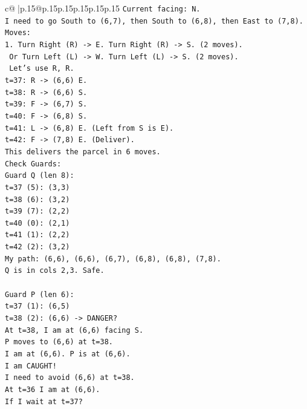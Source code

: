 \documentclass{article}
\begin{document}
{\begin{supertabular}{c@{$\;$}|p{.15\linewidth}@{}p{.15\linewidth}p{.15\linewidth}p{.15\linewidth}p{.15\linewidth}p{.15\linewidth}}
{{{\texttt{Current facing: N.} \\
\texttt{I need to go South to (6,7), then South to (6,8), then East to (7,8).} \\
\texttt{Moves:} \\
\texttt{1. Turn Right (R) {-}> E. Turn Right (R) {-}> S. (2 moves).} \\
\texttt{   Or Turn Left (L) {-}> W. Turn Left (L) {-}> S. (2 moves).} \\
\texttt{   Let's use R, R.} \\
\texttt{t=37: R {-}> (6,6) E.} \\
\texttt{t=38: R {-}> (6,6) S.} \\
\texttt{t=39: F {-}> (6,7) S.} \\
\texttt{t=40: F {-}> (6,8) S.} \\
\texttt{t=41: L {-}> (6,8) E. (Left from S is E).} \\
\texttt{t=42: F {-}> (7,8) E. (Deliver).} \\
\texttt{This delivers the parcel in 6 moves.} \\
\texttt{Check Guards:} \\
\texttt{Guard Q (len 8):} \\
\texttt{t=37 (5): (3,3)} \\
\texttt{t=38 (6): (3,2)} \\
\texttt{t=39 (7): (2,2)} \\
\texttt{t=40 (0): (2,1)} \\
\texttt{t=41 (1): (2,2)} \\
\texttt{t=42 (2): (3,2)} \\
\texttt{My path: (6,6), (6,6), (6,7), (6,8), (6,8), (7,8).} \\
\texttt{Q is in cols 2,3. Safe.} \\
\\ 
\texttt{Guard P (len 6):} \\
\texttt{t=37 (1): (6,5)} \\
\texttt{t=38 (2): (6,6) {-}> DANGER?} \\
\texttt{At t=38, I am at (6,6) facing S.} \\
\texttt{P moves to (6,6) at t=38.} \\
\texttt{I am at (6,6). P is at (6,6).} \\
\texttt{I am CAUGHT!} \\
\texttt{I need to avoid (6,6) at t=38.} \\
\texttt{At t=36 I am at (6,6).} \\
\texttt{If I wait at t=37?} \\
}}}
\end{supertabular}}
\end{document}
